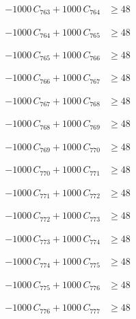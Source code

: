 \documentclass[a4paper,11pt]{article}
\begin{document}
\begin{align}
-1000\,C_{763} + 1000\,C_{764} &\geq 48 \nonumber
\end{align}

\begin{align}
-1000\,C_{764} + 1000\,C_{765} &\geq 48 \nonumber
\end{align}

\begin{align}
-1000\,C_{765} + 1000\,C_{766} &\geq 48 \nonumber
\end{align}

\begin{align}
-1000\,C_{766} + 1000\,C_{767} &\geq 48 \nonumber
\end{align}

\begin{align}
-1000\,C_{767} + 1000\,C_{768} &\geq 48 \nonumber
\end{align}

\begin{align}
-1000\,C_{768} + 1000\,C_{769} &\geq 48 \nonumber
\end{align}

\begin{align}
-1000\,C_{769} + 1000\,C_{770} &\geq 48 \nonumber
\end{align}

\begin{align}
-1000\,C_{770} + 1000\,C_{771} &\geq 48 \nonumber
\end{align}

\begin{align}
-1000\,C_{771} + 1000\,C_{772} &\geq 48 \nonumber
\end{align}

\begin{align}
-1000\,C_{772} + 1000\,C_{773} &\geq 48 \nonumber
\end{align}

\begin{align}
-1000\,C_{773} + 1000\,C_{774} &\geq 48 \nonumber
\end{align}

\begin{align}
-1000\,C_{774} + 1000\,C_{775} &\geq 48 \nonumber
\end{align}

\begin{align}
-1000\,C_{775} + 1000\,C_{776} &\geq 48 \nonumber
\end{align}

\begin{align}
-1000\,C_{776} + 1000\,C_{777} &\geq 48 \nonumber
\end{align}
\end{document}
